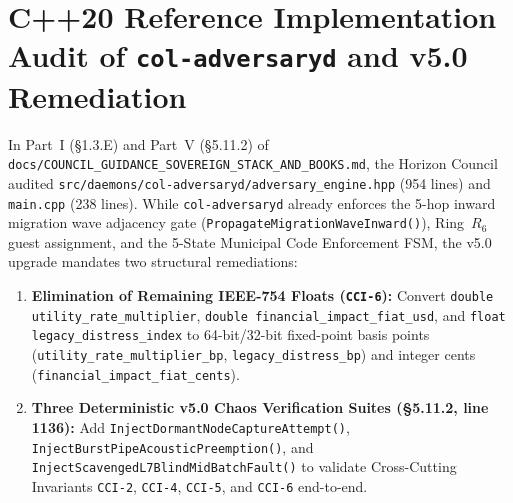 \section{C++20 Reference Implementation Audit of \texttt{col-adversaryd} and v5.0 Remediation}
\label{sec:l7-cpp20-reference-audit}

In Part~I (\S 1.3.E) and Part~V (\S 5.11.2) of \texttt{docs/COUNCIL\_GUIDANCE\_SOVEREIGN\_STACK\_AND\_BOOKS.md}, the Horizon Council audited \texttt{src/daemons/col-adversaryd/adversary\_engine.hpp} (954 lines) and \texttt{main.cpp} (238 lines). While \texttt{col-adversaryd} already enforces the 5-hop inward migration wave adjacency gate (\texttt{PropagateMigrationWaveInward()}), Ring~$R_6$ guest assignment, and the 5-State Municipal Code Enforcement FSM, the v5.0 upgrade mandates two structural remediations:
\begin{enumerate}
    \item \textbf{Elimination of Remaining IEEE-754 Floats (\texttt{CCI-6}):} Convert \texttt{double utility\_rate\_multiplier}, \texttt{double financial\_impact\_fiat\_usd}, and \texttt{float legacy\_distress\_index} to 64-bit/32-bit fixed-point basis points (\texttt{utility\_rate\_multiplier\_bp}, \texttt{legacy\_distress\_bp}) and integer cents (\texttt{financial\_impact\_fiat\_cents}).
    \item \textbf{Three Deterministic v5.0 Chaos Verification Suites (\S 5.11.2, line 1136):} Add \texttt{InjectDormantNodeCaptureAttempt()}, \texttt{InjectBurstPipeAcousticPreemption()}, and \texttt{InjectScavengedL7BlindMidBatchFault()} to validate Cross-Cutting Invariants \texttt{CCI-2}, \texttt{CCI-4}, \texttt{CCI-5}, and \texttt{CCI-6} end-to-end.
\end{enumerate}

